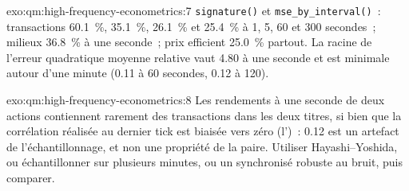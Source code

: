 \begin{solution}{exo:qm:high-frequency-econometrics:7}
\texttt{signature()} et \texttt{mse\_by\_interval()}~: transactions 60.1~\%, 35.1~\%, 26.1~\% et 25.4~\% à 1, 5, 60 et 300 secondes~; milieux 36.8~\% à une seconde~; prix efficient 25.0~\% partout. La
racine de l'erreur quadratique moyenne relative vaut 4.80 à une seconde et est minimale autour d'une minute (0.11 à 60 secondes, 0.12 à 120).
\end{solution}

\begin{solution}{exo:qm:high-frequency-econometrics:8}
Les rendements à une seconde de deux actions contiennent rarement des transactions dans les deux titres, si bien que la corrélation réalisée au dernier tick est biaisée vers zéro (l')~: 0.12 est un artefact de
l'échantillonnage, et non une propriété de la paire. Utiliser Hayashi--Yoshida, ou échantillonner sur plusieurs minutes, ou un  synchronisé robuste au bruit, puis comparer.
\end{solution}

